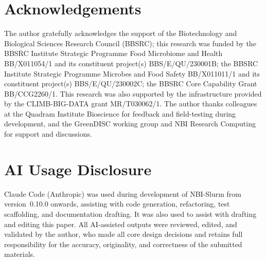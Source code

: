 \documentclass[11pt,a4paper]{article}
\begin{document}
\section*{Acknowledgements}

The author gratefully acknowledges the support of the Biotechnology and Biological Sciences
Research Council (BBSRC); this research was funded by the BBSRC Institute Strategic Programme
Food Microbiome and Health BB/X011054/1 and its constituent project(s) BBS/E/QU/230001B; the
BBSRC Institute Strategic Programme Microbes and Food Safety BB/X011011/1 and its constituent
project(s) BBS/E/QU/230002C; the BBSRC Core Capability Grant BB/CCG2260/1.
This research was also supported by the infrastructure provided by the CLIMB-BIG-DATA grant
MR/T030062/1.
The author thanks colleagues at the Quadram Institute Bioscience for feedback and field-testing
during development, and the GreenDISC working group and NBI Research Computing for support and
discussions.

\section*{AI Usage Disclosure}

Claude Code (Anthropic) was used during development of NBI-Slurm from version~0.10.0 onwards,
assisting with code generation, refactoring, test scaffolding, and documentation drafting.
It was also used to assist with drafting and editing this paper.
All AI-assisted outputs were reviewed, edited, and validated by the author, who made all core
design decisions and retains full responsibility for the accuracy, originality, and correctness
of the submitted materials.



\end{document}
